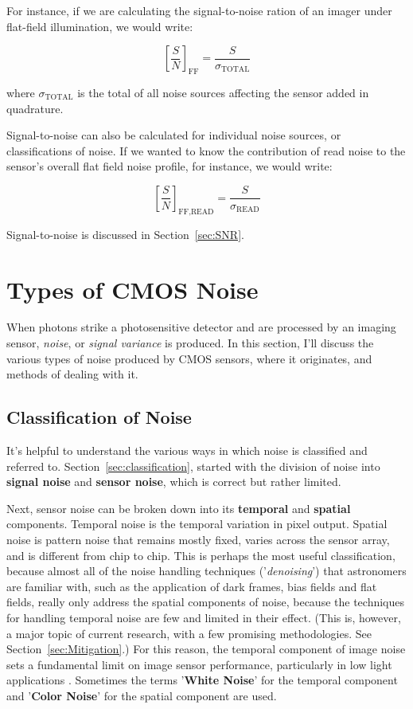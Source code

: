\documentclass[10pt]{article}
\begin{document}
For instance, if we are calculating the signal-to-noise ration of an imager under flat-field illumination, we would write:

$$ \left [ \frac{S}{N} \right ] _{\text{FF}} = \frac{S}{\sigma_{\text{TOTAL}}} $$ 

\vspace{2mm}

\noindent where $ \sigma_{\text{TOTAL}} $ is the total of all noise sources affecting the sensor added in quadrature.

Signal-to-noise can also be calculated for individual noise sources, or classifications of noise. If we wanted to know the contribution of read noise to the sensor's overall flat field noise profile, for instance, we would write:

$$ \left [ \frac{S}{N} \right ] _{\text{FF,READ}} = \frac{S}{\sigma_{\text{READ}}} $$ 

\vspace{2mm}
Signal-to-noise is discussed in Section~\ref{sec:SNR}.

\section{Types of CMOS Noise}
\label{sec:cmosnoise}

When photons strike a photosensitive detector and are processed by an imaging sensor, \emph{noise}, or \emph{signal variance} is produced. In this section, I'll discuss the various types of noise produced by CMOS sensors, where it originates, and methods of dealing with it.

\subsection{Classification of Noise}

It's helpful to understand the various ways in which noise is classified and referred to. Section~\ref{sec:classification}, started with the division of noise into \textbf{signal noise} and \textbf{sensor noise}, which is correct but rather limited. 

Next, sensor noise can be broken down into its \textbf{temporal} and \textbf{spatial} components. Temporal noise is the temporal variation in pixel output. Spatial noise is pattern noise that remains mostly fixed, varies across the sensor array, and is different from chip to chip. This is perhaps the most useful classification, because almost all of the noise handling techniques ('\emph{denoising}') that astronomers are familiar with, such as the application of dark frames, bias fields and flat fields, really only address the spatial components of noise, because the techniques for handling temporal noise are few and limited in their effect. (This is, however, a major topic of current research, with a few promising methodologies. See Section~\ref{sec:Mitigation}.) For this reason, the temporal component of image noise sets a fundamental limit on image sensor performance, particularly in low light applications \cite{tian99}. Sometimes the terms '\textbf{White Noise}' for the temporal component and '\textbf{Color Noise}' for the spatial component are used.
\end{document}
